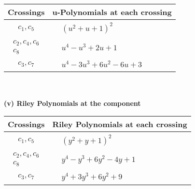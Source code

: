 \documentclass[1p]{elsarticle_modified}
\theoremstyle{definition}
\begin{document}
\begin{tabular}{m{50pt}|m{274pt}}
Crossings & \hspace{64pt}u-Polynomials at each crossing \\
\hline $$\begin{aligned}c_{1},c_{5}\end{aligned}$$&$\begin{aligned}
&(u^2+u+1)^2
\end{aligned}$\\
\hline $$\begin{aligned}c_{2},c_{4},c_{6}\\c_{8}\end{aligned}$$&$\begin{aligned}
&u^4- u^3+2 u+1
\end{aligned}$\\
\hline $$\begin{aligned}c_{3},c_{7}\end{aligned}$$&$\begin{aligned}
&u^4-3 u^3+6 u^2-6 u+3
\end{aligned}$\\
\hline
\end{tabular}\\~\\
\newpage\renewcommand{\arraystretch}{1}
\flushleft \textbf{(v) Riley Polynomials at the component}\newline \\
\begin{tabular}{m{50pt}|m{274pt}}
Crossings & \hspace{64pt}Riley Polynomials at each crossing \\
\hline $$\begin{aligned}c_{1},c_{5}\end{aligned}$$&$\begin{aligned}
&(y^2+y+1)^2
\end{aligned}$\\
\hline $$\begin{aligned}c_{2},c_{4},c_{6}\\c_{8}\end{aligned}$$&$\begin{aligned}
&y^4- y^3+6 y^2-4 y+1
\end{aligned}$\\
\hline $$\begin{aligned}c_{3},c_{7}\end{aligned}$$&$\begin{aligned}
&y^4+3 y^3+6 y^2+9
\end{aligned}$\\
\hline
\end{tabular}\\~\\
\end{document}

